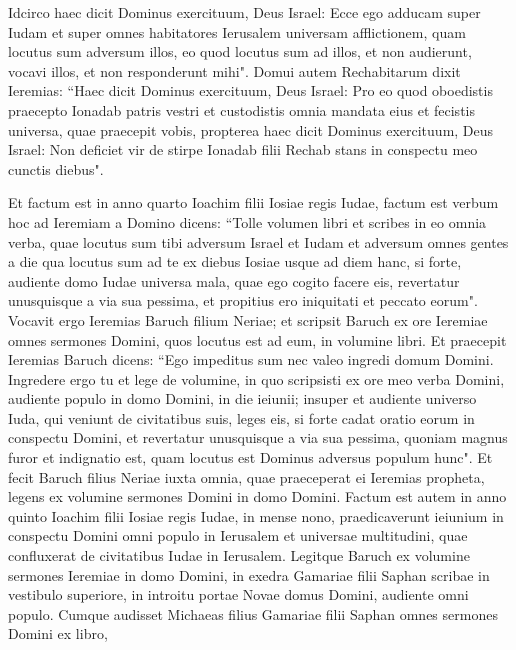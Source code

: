 \begin{biblechapter}
\verse Idcirco haec dicit Dominus exercituum, Deus Israel: Ecce ego adducam super Iudam et super omnes habitatores Ierusalem universam afflictionem, quam locutus sum adversum illos, eo quod locutus sum ad illos, et non audierunt, vocavi illos, et non responderunt mihi". 
\verse Domui autem Rechabitarum dixit Ieremias: “Haec dicit Dominus exercituum, Deus Israel: Pro eo quod oboedistis praecepto Ionadab patris vestri et custodistis omnia mandata eius et fecistis universa, quae praecepit vobis,  
\verse propterea haec dicit Dominus exercituum, Deus Israel: Non deficiet vir de stirpe Ionadab filii Rechab stans in conspectu meo cunctis diebus". 
\end{biblechapter}

\begin{biblechapter}  
\verse Et factum est in anno quarto Ioachim filii Iosiae regis Iudae, factum est verbum hoc ad Ieremiam a Domino dicens: 
\verse “Tolle volumen libri et scribes in eo omnia verba, quae locutus sum tibi adversum Israel et Iudam et adversum omnes gentes a die qua locutus sum ad te ex diebus Iosiae usque ad diem hanc,  
\verse si forte, audiente domo Iudae universa mala, quae ego cogito facere eis, revertatur unusquisque a via sua pessima, et propitius ero iniquitati et peccato eorum". 
\verse Vocavit ergo Ieremias Baruch filium Neriae; et scripsit Baruch ex ore Ieremiae omnes sermones Domini, quos locutus est ad eum, in volumine libri. 
\verse Et praecepit Ieremias Baruch dicens: “Ego impeditus sum nec valeo ingredi domum Domini. 
\verse Ingredere ergo tu et lege de volumine, in quo scripsisti ex ore meo verba Domini, audiente populo in domo Domini, in die ieiunii; insuper et audiente universo Iuda, qui veniunt de civitatibus suis, leges eis, 
\verse si forte cadat oratio eorum in conspectu Domini, et revertatur unusquisque a via sua pessima, quoniam magnus furor et indignatio est, quam locutus est Dominus adversus populum hunc". 
\verse Et fecit Baruch filius Neriae iuxta omnia, quae praeceperat ei Ieremias propheta, legens ex volumine sermones Domini in domo Domini. 
\verse Factum est autem in anno quinto Ioachim filii Iosiae regis Iudae, in mense nono, praedicaverunt ieiunium in conspectu Domini omni populo in Ierusalem et universae multitudini, quae confluxerat de civitatibus Iudae in Ierusalem.  
\verse Legitque Baruch ex volumine sermones Ieremiae in domo Domini, in exedra Gamariae filii Saphan scribae in vestibulo superiore, in introitu portae Novae domus Domini, audiente omni populo. 
\verse Cumque audisset Michaeas filius Gamariae filii Saphan omnes sermones Domini ex libro, 

\end{biblechapter}
